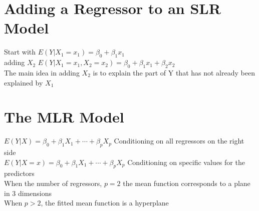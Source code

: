 \documentclass[openany]{book}
\newcommand{\B}{\beta}
\numberwithin{equation}{section}
\begin{document}
\begin{flushleft}
\section{Adding a Regressor to an SLR Model}
Start with $E(Y|X_1=x_1)=\B_0+\B_1x_1$\\
adding $X_2$ $E(Y|X_1=x_1,X_2=x_2)=\B_0+\B_1x_1+\B_2x_2$\\
The main idea in adding $X_2$ is to explain the part of Y that has not already been explained by $X_1$\\
\section{The MLR Model}
$E(Y|X)=\B_0+\B_1X_1+\cdots+\B_pX_p$ Conditioning on all regressors on the right side\\
$E(Y|X=x)=\B_0+\B_1X_1+\cdots+\B_pX_p$ Conditioning on specific values for the predictors\\
When the number of regressors, $p=2$ the mean function corresponds to a plane in  
3 dimensions\\
When $p>2$, the fitted mean function is a hyperplane\\

\end{flushleft}
\end{document}
